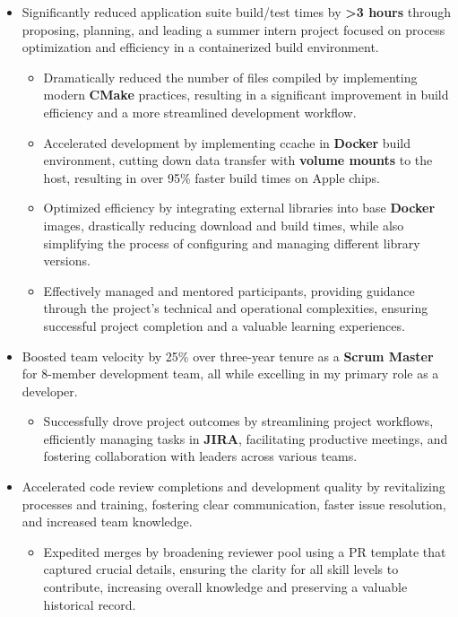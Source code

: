 \documentclass[a4paper]{article}
\begin{document}
\begin{itemize}
\begin{itemize}
        \end{itemize}
	\item Significantly reduced application suite build/test times by \textbf{>3 hours} through proposing, planning, and leading a summer intern project focused on process optimization and efficiency in a containerized build environment.
    \begin{itemize}
	    \item Dramatically reduced the number of files compiled by implementing modern \textbf{CMake} practices, resulting in a significant improvement in build efficiency and a more streamlined development workflow.
	    \item Accelerated development by implementing ccache in \textbf{Docker} build environment, cutting down data transfer with \textbf{volume mounts} to the host, resulting in over 95\% faster build times on Apple chips.
	    \item Optimized efficiency by integrating external libraries into base \textbf{Docker} images, drastically reducing download and build times, while also simplifying the process of configuring and managing different library versions.
	    \item Effectively managed and mentored participants, providing guidance through the project's technical and operational complexities, ensuring successful project completion and a valuable learning experiences.
    \end{itemize}
	\item Boosted team velocity by 25\% over three-year tenure as a \textbf{Scrum Master} for 8-member development team, all while excelling in my primary role as a developer.
    \begin{itemize}
	    \item Successfully drove project outcomes by streamlining project workflows, efficiently managing tasks in \textbf{JIRA}, facilitating productive meetings, and fostering collaboration with leaders across various teams.
    \end{itemize}
	\item Accelerated code review completions and development quality by revitalizing processes and training, fostering clear communication, faster issue resolution, and increased team knowledge.
    \begin{itemize}
	    \item Expedited merges by broadening reviewer pool using a PR template that captured crucial details, ensuring the clarity for all skill levels to contribute, increasing overall knowledge and preserving a valuable historical record.

\end{itemize}
\end{itemize}
\end{document}

